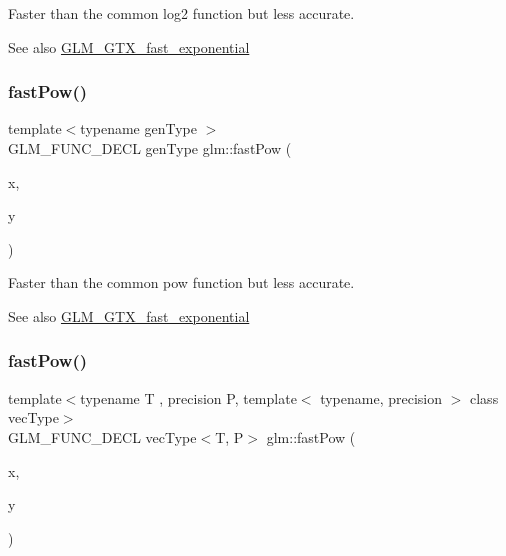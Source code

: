 Faster than the common log2 function but less accurate. \begin{DoxySeeAlso}{See also}
\hyperlink{group__gtx__fast__exponential}{G\+L\+M\+\_\+\+G\+T\+X\+\_\+fast\+\_\+exponential} 
\end{DoxySeeAlso}
\mbox{\label{group__gtx__fast__exponential_ga5340e98a11fcbbd936ba6e983a154d50}} 
\subsubsection{\texorpdfstring{fast\+Pow()}{fastPow()}\hspace{0.1cm}{\footnotesize\ttfamily [1/4]}}
{\footnotesize\ttfamily template$<$typename gen\+Type $>$ \\
G\+L\+M\+\_\+\+F\+U\+N\+C\+\_\+\+D\+E\+CL gen\+Type glm\+::fast\+Pow (\begin{DoxyParamCaption}\item[{gen\+Type}]{x,  }\item[{gen\+Type}]{y }\end{DoxyParamCaption})}

Faster than the common pow function but less accurate. \begin{DoxySeeAlso}{See also}
\hyperlink{group__gtx__fast__exponential}{G\+L\+M\+\_\+\+G\+T\+X\+\_\+fast\+\_\+exponential} 
\end{DoxySeeAlso}
\mbox{\label{group__gtx__fast__exponential_ga07b73976a9af4005945bc338b45d8466}} 
\subsubsection{\texorpdfstring{fast\+Pow()}{fastPow()}\hspace{0.1cm}{\footnotesize\ttfamily [2/4]}}
{\footnotesize\ttfamily template$<$typename T , precision P, template$<$ typename, precision $>$ class vec\+Type$>$ \\
G\+L\+M\+\_\+\+F\+U\+N\+C\+\_\+\+D\+E\+CL vec\+Type$<$T, P$>$ glm\+::fast\+Pow (\begin{DoxyParamCaption}\item[{vec\+Type$<$ T, P $>$ const \&}]{x,  }\item[{vec\+Type$<$ T, P $>$ const \&}]{y }\end{DoxyParamCaption})}

